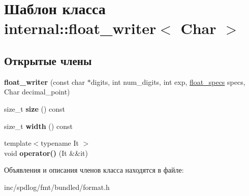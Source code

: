 \hypertarget{classinternal_1_1float__writer}{}\section{Шаблон класса internal\+:\+:float\+\_\+writer$<$ Char $>$}
\label{classinternal_1_1float__writer}
\subsection*{Открытые члены}
\begin{DoxyCompactItemize}
\item 
\mbox{\label{classinternal_1_1float__writer_a12ff1bf1add3b986f532eb54f735754e}} 
{\bfseries float\+\_\+writer} (const char $\ast$digits, int num\+\_\+digits, int exp, \hyperlink{structinternal_1_1float__specs}{float\+\_\+specs} specs, Char decimal\+\_\+point)
\item 
\mbox{\label{classinternal_1_1float__writer_a7845957517a1fd15e4e891ed41907bc5}} 
size\+\_\+t {\bfseries size} () const
\item 
\mbox{\label{classinternal_1_1float__writer_aa1f809eb0558961ac85df9f788cdb99a}} 
size\+\_\+t {\bfseries width} () const
\item 
\mbox{\label{classinternal_1_1float__writer_a9ff3a8e8591ef526adafc52c326481a4}} 
{\footnotesize template$<$typename It $>$ }\\void {\bfseries operator()} (It \&\&it)
\end{DoxyCompactItemize}


Объявления и описания членов класса находятся в файле\+:\begin{DoxyCompactItemize}
\item 
inc/spdlog/fmt/bundled/format.\+h\end{DoxyCompactItemize}
